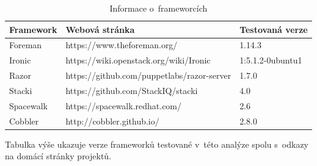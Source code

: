 \begin{table}[h]
\centering
\caption{Informace o~frameworcích}
\label{my-label}
\begin{tabular}{@{}lll@{}}
\toprule

Framework &	Webová stránka &	Testovaná verze  \\ \midrule
Foreman & https://www.theforeman.org/ & 1.14.3 \\
Ironic & https://wiki.openstack.org/wiki/Ironic & 1:5.1.2-0ubuntu1  \\
Razor & https://github.com/puppetlabs/razor-server & 1.7.0 \\
Stacki & https://github.com/StackIQ/stacki & 4.0  \\
Spacewalk & https://spacewalk.redhat.com/ &  2.6 \\
Cobbler & http://cobbler.github.io/ & 2.8.0  \\  \bottomrule
\end{tabular}
\end{table}
\newpage

Tabulka výše ukazuje verze frameworků testované v~této analýze spolu s~odkazy na domácí stránky projektů.
